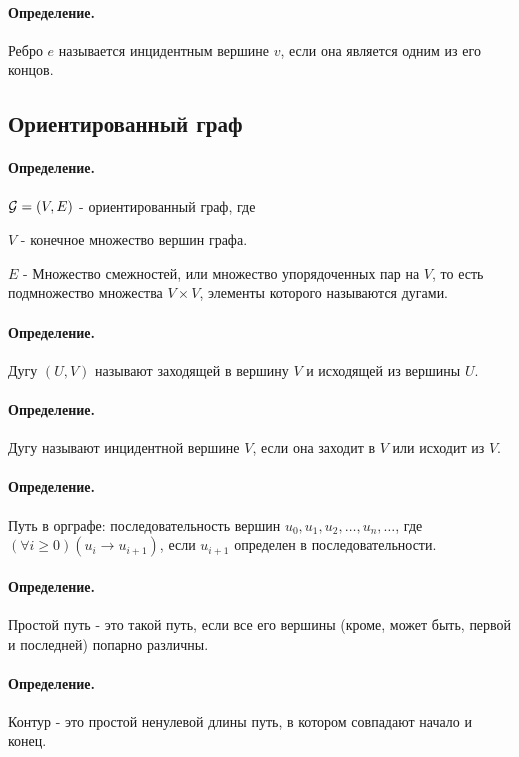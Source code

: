 \documentclass{report}
\begin{document}
\paragraph*{Определение.}
Ребро $e$ называется инцидентным вершине  $v$, если она является одним из его концов.


\subsection{Ориентированный граф}

\paragraph*{Определение.}
$ {\cal G} = (V, E)$ - ориентированный граф, где

$V$ - конечное множество вершин графа.

$E$ - Множество смежностей, или множество упорядоченных пар на  $V$, то есть подмножество
множества  $V \times V$, элементы которого называются дугами.

\paragraph*{Определение.}
Дугу $(U, V)$ называют заходящей в вершину  $V$ и исходящей из вершины  $U$.

\paragraph*{Определение.}
Дугу называют инцидентной вершине $V$, если она заходит в  $V$ или исходит из $V$.

\paragraph*{Определение.}
Путь в орграфе: последовательность вершин $u_0, u_1, u_2,\ldots,u_n,\ldots$, где $(\forall i \ge  0)
	(u_i \to u_{i+1})$, если $u_{i+1}$ определен в последовательности.

\paragraph*{Определение.}
Простой путь - это такой путь, если все его вершины (кроме, может быть, первой и последней)
попарно различны.

\paragraph*{Определение.}
Контур - это простой ненулевой длины путь, в котором совпадают начало и конец.
\end{document}

